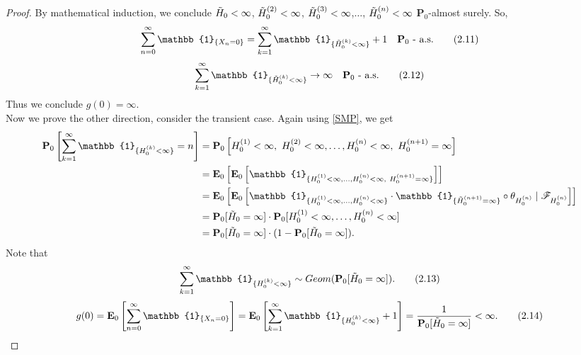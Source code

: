 \documentclass[
11pt, %
a4paper, %
oneside, %
headinclude,footinclude, %
BCOR5mm, %
]{scrartcl}
\begin{document}
\begin{proof}
    By mathematical induction, we conclude $\Tilde{H}_0<\infty$, $\Tilde{H}_0^{(2)}<\infty$, $\Tilde{H}_0^{(3)}<\infty$,$\dots$, $\Tilde{H}_0^{(n)}<\infty$ $\mathbf{P}_0$-almost surely. So,
    \begin{equation}
        \sum^\infty_{n=0} \mathbb{1}_{\{X_n=0\}}=\sum^\infty_{k=1} \mathbb{1}_{\{\Tilde{H}^{(k)}_0<\infty\}}+1 \quad \mathbf{P}_0 \text{ - a.s.} \tag{2.11}
    \end{equation}
    \begin{equation}
        \sum^\infty_{k=1} \mathbb{1}_{\{\Tilde{H}^{(k)}_0<\infty\}} \rightarrow \infty \quad \mathbf{P}_0 \text{ - a.s.}\tag{2.12}
    \end{equation}
    Thus we conclude $g(0)= \infty$.
    \\Now we prove the other direction, consider the transient case. Again using \eqref{SMP}, we get
    \begin{align}
        \mathbf{P}_0 \left[ \sum^\infty_{k=1} \mathbb{1}_{ \{ H_0^{(k)}<\infty\} }=n \right]&=\mathbf{P}_0 \left[ H_0^{(1)}<\infty, \ H_0^{(2)}<\infty, \dots, H_0^{(n)}<\infty, \ H_0^{(n+1)}=\infty \right] \notag \\
        &=\mathbf{E}_0 \left[ \mathbf{E}_0 \left[ \mathbb{1}_{ \{H_0^{(1)}<\infty, \dots, H_0^{(n)}<\infty, \ H_0^{(n+1)}=\infty\} }\right]\right] \notag \\
        &=\mathbf{E}_0 \left[ \mathbf{E}_0 \left[ \mathbb{1}_{ \{H_0^{(1)}< \infty, \dots, H_0^{(n)}<\infty \}} \cdot \mathbb{1}_{ \{ \Tilde{H}_0^{(n+1)}=\infty \} } \circ \theta_{H_0^{(n)}} \mid \mathscr{F}_{H_0^{(n)}} \right] \right] \notag \\
        &=\mathbf{P}_0[\Tilde{H}_0=\infty] \cdot \mathbf{P}_0[H_0^{(1)}<\infty, \dots, H_0^{(n)}<\infty] \notag \\
        &=\mathbf{P}_0[\Tilde{H}_0=\infty] \cdot (1-\mathbf{P}_0[\Tilde{H}_0=\infty]). \notag
    \end{align}
Note that 
    \begin{equation}
        \sum^\infty_{k=1} \mathbb{1}_{ \{ H_0^{(k)}<\infty\} } \sim Geom(\mathbf{P}_0[\Tilde{H}_0=\infty]).\tag{2.13}
    \end{equation}
    \begin{equation}
        g(0)=\mathbf{E}_0\left[ \sum^\infty_{n=0} \mathbb{1}_{\{X_n=0\}}\right] =\mathbf{E}_0 \left[ \sum^\infty_{k=1} \mathbb{1}_{\{H^{(k)}_0<\infty\}}+1 \right]=\frac{1}{\mathbf{P}_0[\Tilde{H}_0=\infty]}<\infty.\tag{2.14}
    \end{equation}
\end{proof}
\end{document}
